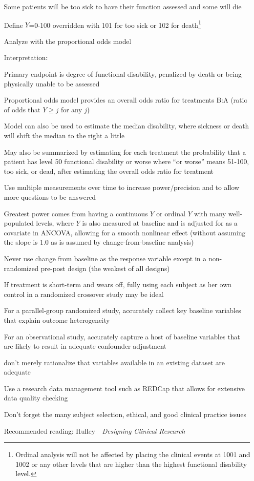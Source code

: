   \item Some patients will be too sick to have their function assessed and some will die
\setcounter{footnote}{0}
  \item Define $Y$=0-100 overridden with 101 for too sick or 102 for death\footnote{Ordinal analysis will not be affected by placing the clinical events at 1001 and 1002 or any other levels that are higher than the highest functional disability level.}
  \item Analyze with the proportional odds model
  \item Interpretation:
   \bi
   \item Primary endpoint is degree of functional disability, penalized by death or being physically unable to be assessed
   \item Proportional odds model provides an overall odds ratio for treatments B:A (ratio of odds that $Y \geq j$ for any $j$)
   \item Model can also be used to estimate the median disability, where sickness or death will shift the median to the right a little
   \item May also be summarized by estimating for each treatment the probability that a patient has level 50 functional disability or worse where ``or worse'' means 51-100, too sick, or dead, after estimating the overall odds ratio for treatment
   \ei
  \ei
\item Use multiple measurements over time to increase power/precision and to allow more questions to be answered
\item Greatest power comes from having a continuous $Y$ or ordinal $Y$ with many well-populated levels, where $Y$ is also measured at baseline and is adjusted for as a covariate in ANCOVA, allowing for a smooth nonlinear effect (without assuming the slope is 1.0 as is assumed by change-from-baseline analysis)
\item Never use change from baseline as the response variable except in a non-randomized pre-post design (the weakest of all designs)
\item If treatment is short-term and wears off, fully using each subject as her own control in a randomized crossover study may be ideal
\item For a parallel-group randomized study, accurately collect key baseline variables that explain outcome heterogeneity
\item For an observational study, accurately capture a host of baseline variables that are likely to result in adequate confounder adjustment
 \bi
 \item don't merely rationalize that variables available in an existing dataset are adequate
 \ei
\item Use a research data management tool such as REDCap that allows for extensive data quality checking
\item Don't forget the many subject selection, ethical, and good clinical practice issues
\item Recommended reading: Hulley~\etal~\emph{Designing Clinical Research}~\cite{hul13des}
\ei 

